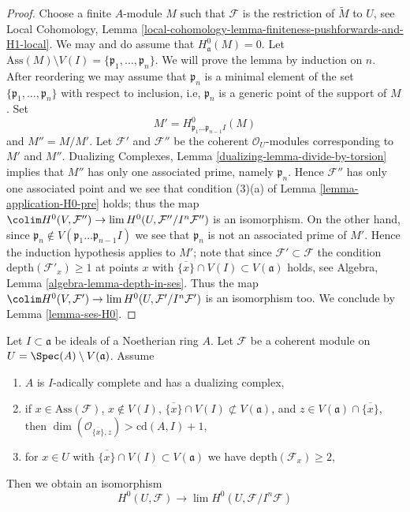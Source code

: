 \begin{proof}
\medskip\noindent
Choose a finite $A$-module $M$ such that $\mathcal{F}$ is the restriction
of $\widetilde{M}$ to $U$, see Local Cohomology, Lemma
\ref{local-cohomology-lemma-finiteness-pushforwards-and-H1-local}.
We may and do assume that $H^0_\mathfrak a(M) = 0$.
Let $\text{Ass}(M) \setminus V(I) = \{\mathfrak p_1, \ldots, \mathfrak p_n\}$.
We will prove the lemma by induction on $n$. After reordering we
may assume that $\mathfrak p_n$ is a minimal element of the set
$\{\mathfrak p_1, \ldots, \mathfrak p_n\}$ with respect to inclusion, i.e,
$\mathfrak p_n$ is a generic point of the support of $M$.
Set
$$
M' = H^0_{\mathfrak p_1 \ldots \mathfrak p_{n - 1} I}(M)
$$
and $M'' = M/M'$. Let $\mathcal{F}'$ and $\mathcal{F}''$ be the
coherent $\mathcal{O}_U$-modules corresponding to $M'$ and $M''$.
Dualizing Complexes, Lemma \ref{dualizing-lemma-divide-by-torsion}
implies that $M''$ has only one associated prime, namely $\mathfrak p_n$.
Hence $\mathcal{F}''$ has only one associated point and
we see that condition (3)(a) of Lemma \ref{lemma-application-H0-pre} holds;
thus the map $\colim H^0(V, \mathcal{F}'')
\to \lim H^0(U, \mathcal{F}''/I^n\mathcal{F}'')$ is an isomorphism.
On the other hand, since
$\mathfrak p_n \not \in V(\mathfrak p_1 \ldots \mathfrak p_{n - 1} I)$
we see that $\mathfrak p_n$ is not an associated prime of $M'$.
Hence the induction hypothesis applies to $M'$; note
that since $\mathcal{F}' \subset \mathcal{F}$
the condition $\text{depth}(\mathcal{F}'_x) \geq 1$ at points $x$ with
$\overline{\{x\}} \cap V(I) \subset V(\mathfrak a)$ holds, see
Algebra, Lemma \ref{algebra-lemma-depth-in-ses}.
Thus the map
$\colim H^0(V, \mathcal{F}')
\to \lim H^0(U, \mathcal{F}'/I^n\mathcal{F}')$ is an isomorphism too.
We conclude by Lemma \ref{lemma-ses-H0}.
\end{proof}

\begin{lemma}
\label{lemma-application-H0}
Let $I \subset \mathfrak a$ be ideals of a Noetherian ring $A$.
Let $\mathcal{F}$ be a coherent module on
$U = \Spec(A) \setminus V(\mathfrak a)$.
Assume
\begin{enumerate}
\item $A$ is $I$-adically complete and has a dualizing complex,
\item if $x \in \text{Ass}(\mathcal{F})$, $x \not \in V(I)$,
$\overline{\{x\}} \cap V(I) \not \subset V(\mathfrak a)$, and
$z \in V(\mathfrak a) \cap \overline{\{x\}}$, then
$\dim(\mathcal{O}_{\overline{\{x\}}, z}) > \text{cd}(A, I) + 1$,
\item for $x \in U$ with $\overline{\{x\}} \cap V(I) \subset V(\mathfrak a)$
we have $\text{depth}(\mathcal{F}_x) \geq 2$,
\end{enumerate}
Then we obtain an isomorphism
$$
H^0(U, \mathcal{F})
\longrightarrow
\lim H^0(U, \mathcal{F}/I^n\mathcal{F})
$$
\end{lemma}

